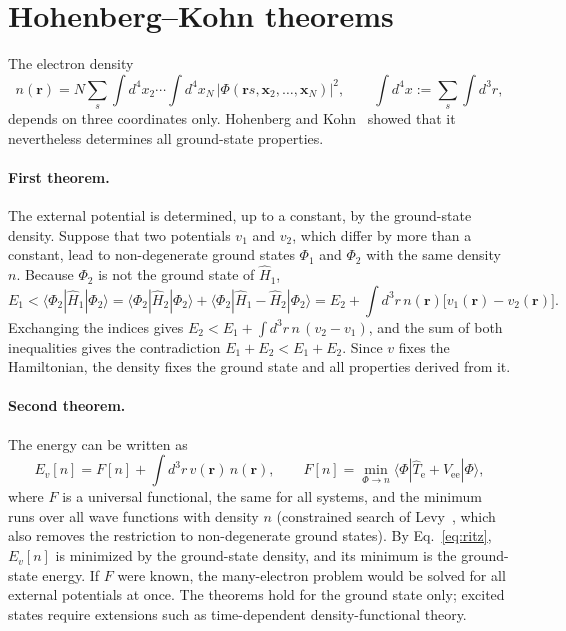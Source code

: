 \documentclass[11pt,a4paper,oneside]{book}
\newcommand{\bra}[1]{\langle #1|}
\newcommand{\ket}[1]{|#1\rangle}
\begin{document}
\section{Hohenberg--Kohn theorems}

The electron density
\begin{equation}
  n(\bm r)=N\sum_{s}\int d^4x_2\cdots\int d^4x_N\,
  |\Phi(\bm r s,\bm x_2,\dots,\bm x_N)|^2,
  \qquad \int d^4x:=\sum_s\int d^3r,
\end{equation}
depends on three coordinates only. Hohenberg and
Kohn~\cite{HohenbergKohn1964} showed that it nevertheless determines
all ground-state properties.

\paragraph{First theorem.} The external potential is determined, up to a
constant, by the ground-state density. Suppose that two potentials
$v_1$ and $v_2$, which differ by more than a constant, lead to
non-degenerate ground states $\Phi_1$ and $\Phi_2$ with the same density
$n$. Because $\Phi_2$ is not the ground state of $\hat H_1$,
\begin{equation}
  E_1<\bra{\Phi_2}\hat H_1\ket{\Phi_2}
  =\bra{\Phi_2}\hat H_2\ket{\Phi_2}+\bra{\Phi_2}\hat H_1-\hat H_2\ket{\Phi_2}
  =E_2+\int d^3r\,n(\bm r)\bigl[v_1(\bm r)-v_2(\bm r)\bigr].
\end{equation}
Exchanging the indices gives
$E_2<E_1+\int d^3r\,n\,(v_2-v_1)$, and the sum of both inequalities
gives the contradiction $E_1+E_2<E_1+E_2$. Since $v$ fixes the
Hamiltonian, the density fixes the ground state and all properties
derived from it.

\paragraph{Second theorem.} The energy can be written as
\begin{equation}
  E_v[n]=F[n]+\int d^3r\,v(\bm r)\,n(\bm r),
  \qquad
  F[n]=\min_{\Phi\to n}\bra{\Phi}\hat T_{\mathrm e}+\hat V_{\mathrm{ee}}\ket{\Phi},
  \label{eq:levy}
\end{equation}
where $F$ is a universal functional, the same for all systems, and the
minimum runs over all wave functions with density $n$ (constrained
search of Levy~\cite{levy79_pnas76_6062}, which also removes the
restriction to non-degenerate ground states). By
Eq.~\eqref{eq:ritz}, $E_v[n]$ is minimized by the ground-state density,
and its minimum is the ground-state energy. If $F$ were known, the
many-electron problem would be solved for all external potentials at
once. The theorems hold for the ground state only; excited states
require extensions such as time-dependent density-functional theory.
\end{document}
